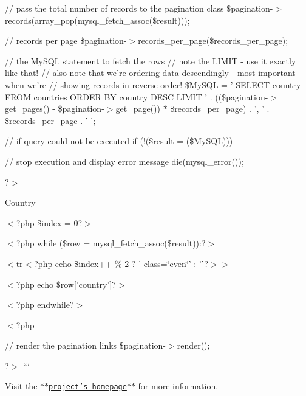 // pass the total number of records to the pagination class \$pagination-\/$>$records(array\-\_\-pop(mysql\-\_\-fetch\-\_\-assoc(\$result)));

// records per page \$pagination-\/$>$records\-\_\-per\-\_\-page(\$records\-\_\-per\-\_\-page);

// the My\-S\-Q\-L statement to fetch the rows // note the L\-I\-M\-I\-T -\/ use it exactly like that! // also note that we're ordering data descendingly -\/ most important when we're // showing records in reverse order! \$\-My\-S\-Q\-L = ' S\-E\-L\-E\-C\-T country F\-R\-O\-M countries O\-R\-D\-E\-R B\-Y country D\-E\-S\-C L\-I\-M\-I\-T ' . ((\$pagination-\/$>$get\-\_\-pages() -\/ \$pagination-\/$>$get\-\_\-page()) $\ast$ \$records\-\_\-per\-\_\-page) . ', ' . \$records\-\_\-per\-\_\-page . ' ';

// if query could not be executed if (!(\$result = (\$\-My\-S\-Q\-L))) \begin{DoxyVerb}// stop execution and display error message
die(mysql_error());
\end{DoxyVerb}


?$>$

\begin{TabularC}{0}
\hline
\end{TabularC}


Country

$<$?php \$index = 0?$>$

$<$?php while (\$row = mysql\-\_\-fetch\-\_\-assoc(\$result))\-:?$>$

$<$tr$<$?php echo \$index++ \% 2 ? ' class=\char`\"{}even\char`\"{}' \-: ''?$>$$>$ 

$<$?php echo \$row\mbox{[}'country'\mbox{]}?$>$ 

$<$?php endwhile?$>$ 

$<$?php

// render the pagination links \$pagination-\/$>$render();

?$>$ ```

Visit the $\ast$$\ast$\href{http://stefangabos.ro/php-libraries/zebra-pagination/}{\tt project's homepage}$\ast$$\ast$ for more information. 